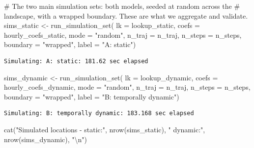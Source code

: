 \documentclass[
  letterpaper,
  DIV=11,
  numbers=noendperiod]{scrartcl}
\newenvironment{Shaded}{\begin{snugshade}}{\end{snugshade}}
\newcommand{\AttributeTok}[1]{\textcolor[rgb]{0.40,0.45,0.13}{#1}}
\newcommand{\CommentTok}[1]{\textcolor[rgb]{0.37,0.37,0.37}{#1}}
\newcommand{\FunctionTok}[1]{\textcolor[rgb]{0.28,0.35,0.67}{#1}}
\newcommand{\NormalTok}[1]{\textcolor[rgb]{0.00,0.23,0.31}{#1}}
\newcommand{\OtherTok}[1]{\textcolor[rgb]{0.00,0.23,0.31}{#1}}
\newcommand{\SpecialCharTok}[1]{\textcolor[rgb]{0.37,0.37,0.37}{#1}}
\newcommand{\StringTok}[1]{\textcolor[rgb]{0.13,0.47,0.30}{#1}}
\begin{document}
\begin{Shaded}
\begin{Highlighting}[]
\CommentTok{\# The two main simulation sets: both models, seeded at random across the}
\CommentTok{\# landscape, with a wrapped boundary. These are what we aggregate and validate.}
\NormalTok{sims\_static }\OtherTok{\textless{}{-}} \FunctionTok{run\_simulation\_set}\NormalTok{(}
  \AttributeTok{lk =}\NormalTok{ lookup\_static, }\AttributeTok{coefs =}\NormalTok{ hourly\_coefs\_static, }\AttributeTok{mode =} \StringTok{"random"}\NormalTok{,}
  \AttributeTok{n\_traj =}\NormalTok{ n\_traj, }\AttributeTok{n\_steps =}\NormalTok{ n\_steps, }\AttributeTok{boundary =} \StringTok{"wrapped"}\NormalTok{,}
  \AttributeTok{label =} \StringTok{"A: static"}\NormalTok{)}
\end{Highlighting}
\end{Shaded}

\begin{verbatim}
Simulating: A: static: 181.62 sec elapsed
\end{verbatim}

\begin{Shaded}
\begin{Highlighting}[]
\NormalTok{sims\_dynamic }\OtherTok{\textless{}{-}} \FunctionTok{run\_simulation\_set}\NormalTok{(}
  \AttributeTok{lk =}\NormalTok{ lookup\_dynamic, }\AttributeTok{coefs =}\NormalTok{ hourly\_coefs\_dynamic, }\AttributeTok{mode =} \StringTok{"random"}\NormalTok{,}
  \AttributeTok{n\_traj =}\NormalTok{ n\_traj, }\AttributeTok{n\_steps =}\NormalTok{ n\_steps, }\AttributeTok{boundary =} \StringTok{"wrapped"}\NormalTok{,}
  \AttributeTok{label =} \StringTok{"B: temporally dynamic"}\NormalTok{)}
\end{Highlighting}
\end{Shaded}

\begin{verbatim}
Simulating: B: temporally dynamic: 183.168 sec elapsed
\end{verbatim}

\begin{Shaded}
\begin{Highlighting}[]
\FunctionTok{cat}\NormalTok{(}\StringTok{"Simulated locations {-} static:"}\NormalTok{, }\FunctionTok{nrow}\NormalTok{(sims\_static),}
    \StringTok{" dynamic:"}\NormalTok{, }\FunctionTok{nrow}\NormalTok{(sims\_dynamic), }\StringTok{"}\SpecialCharTok{\textbackslash{}n}\StringTok{"}\NormalTok{)}
\end{Highlighting}
\end{Shaded}
\end{document}
